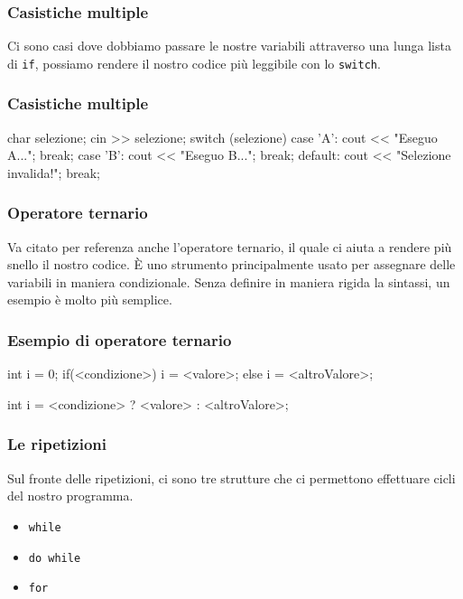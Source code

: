 \documentclass[handout]{beamer}
\begin{document}
    \begin{frame}
        \frametitle{Casistiche multiple}
        Ci sono casi dove dobbiamo passare le nostre variabili attraverso una lunga lista di \texttt{if}, possiamo rendere il nostro codice più leggibile con lo \texttt{switch}. 
    \end{frame}

    \begin{frame}[fragile]
        \frametitle{Casistiche multiple}
        \begin{cppcode}
            char selezione;
            cin >> selezione;
            switch (selezione)
            {
                case 'A':
                    cout << "Eseguo A...";
                    break;
                case 'B':
                    cout << "Eseguo B...";
                    break;
                default:
                    cout << "Selezione invalida!";
                    break;
            }
        \end{cppcode}
    \end{frame}

    \begin{frame}[fragile]
        \frametitle{Operatore ternario}
        Va citato per referenza anche l'operatore ternario, il quale ci aiuta a rendere più snello il nostro codice. È uno strumento principalmente usato per assegnare delle variabili in maniera condizionale. Senza definire in maniera rigida la sintassi, un esempio è molto più semplice.
    \end{frame}

    \begin{frame}[fragile]
        \frametitle{Esempio di operatore ternario}
        \begin{cppcode}
            int i = 0;
            if(<condizione>) {
                i = <valore>;
            } else {
                i = <altroValore>;
            }
        \end{cppcode}
        \begin{cppcode}
            int i = <condizione> ? <valore> : <altroValore>;
        \end{cppcode}
    \end{frame}

    \begin{frame}[fragile]
        \frametitle{Le ripetizioni}
        Sul fronte delle ripetizioni, ci sono tre strutture che ci permettono effettuare cicli del nostro programma.
        \begin{itemize}
            \item<2-> \texttt{while}
            \item<3-> \texttt{do while}
            \item<4-> \texttt{for}
        \end{itemize}
    \end{frame}
\end{document}
